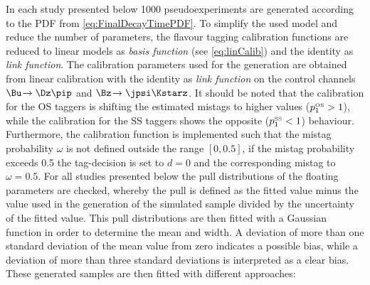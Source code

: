 In each study presented below \num{1000} pseudoexperiments are generated according to the PDF from \cref{eq:FinalDecayTimePDF}.
To simplify the used model and reduce the number of parameters, the flavour tagging calibration functions are reduced to linear models as \emph{basis function} (see \cref{eq:linCalib}) and the identity as \emph{link function}.
The calibration parameters used for the generation are obtained from linear calibration with the identity as \emph{link function} on the control channels $\Bu\!\to\Dz\pip$ and $\Bz\!\to\jpsi\Kstarz$.
It should be noted that the calibration for the OS taggers is shifting the estimated mistags to higher values (\ie $p_1^{\text{\tiny OS}}>1$), while the calibration for the SS taggers shows the opposite (\ie $p_1^{\text{\tiny SS}}<1$) behaviour.
Furthermore, the calibration function is implemented such that the mistag probability $\omega$ is not defined outside the range $[0, 0.5]$, \ie if the mistag probability exceeds \num{0.5} the tag-decision is set to $d=0$ and the corresponding mistag to $\omega=0.5$.
For all studies presented below the pull distributions of the floating parameters are checked, whereby the pull is defined as the fitted value minus the value used in the generation of the simulated sample divided by the uncertainty of the fitted value.
This pull distributions are then fitted with a Gaussian function in order to determine the mean and width.
A deviation of more than one standard deviation of the mean value from zero indicates a possible bias, while a deviation of more than three standard deviations is interpreted as a clear bias.
These generated samples are then fitted with different approaches:
